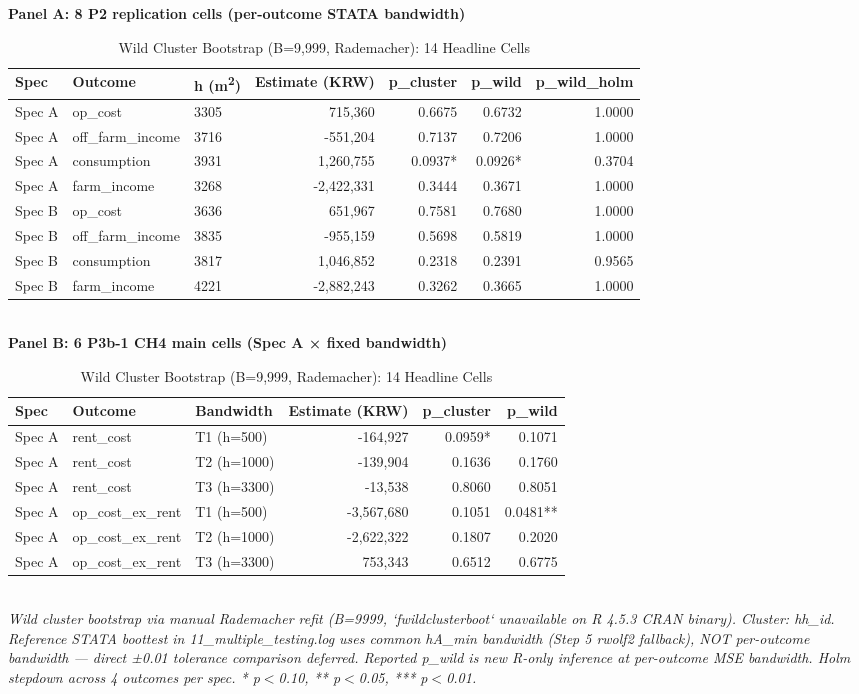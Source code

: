 \begin{table}[t]
\centering
\caption{Wild Cluster Bootstrap (B=9,999, Rademacher): 14 Headline Cells}
\label{tab:wild_bootstrap_en}
\textbf{Panel A: 8 P2 replication cells (per-outcome STATA bandwidth)}\\
\begin{tabular}{lllrrrr}
\toprule
Spec & Outcome & h (m\textsuperscript{2}) & Estimate (KRW) & p\_cluster & p\_wild & p\_wild\_holm \\
\midrule
Spec A & op\_cost & 3305 & 715,360 & 0.6675 & 0.6732 & 1.0000 \\
Spec A & off\_farm\_income & 3716 & -551,204 & 0.7137 & 0.7206 & 1.0000 \\
Spec A & consumption & 3931 & 1,260,755 & 0.0937* & 0.0926* & 0.3704 \\
Spec A & farm\_income & 3268 & -2,422,331 & 0.3444 & 0.3671 & 1.0000 \\
Spec B & op\_cost & 3636 & 651,967 & 0.7581 & 0.7680 & 1.0000 \\
Spec B & off\_farm\_income & 3835 & -955,159 & 0.5698 & 0.5819 & 1.0000 \\
Spec B & consumption & 3817 & 1,046,852 & 0.2318 & 0.2391 & 0.9565 \\
Spec B & farm\_income & 4221 & -2,882,243 & 0.3262 & 0.3665 & 1.0000 \\
\bottomrule
\end{tabular}\\[1ex]
\textbf{Panel B: 6 P3b-1 CH4 main cells (Spec A × fixed bandwidth)}\\
\begin{tabular}{lllrrr}
\toprule
Spec & Outcome & Bandwidth & Estimate (KRW) & p\_cluster & p\_wild \\
\midrule
Spec A & rent\_cost & T1 (h=500) & -164,927 & 0.0959* & 0.1071 \\
Spec A & rent\_cost & T2 (h=1000) & -139,904 & 0.1636 & 0.1760 \\
Spec A & rent\_cost & T3 (h=3300) & -13,538 & 0.8060 & 0.8051 \\
Spec A & op\_cost\_ex\_rent & T1 (h=500) & -3,567,680 & 0.1051 & 0.0481** \\
Spec A & op\_cost\_ex\_rent & T2 (h=1000) & -2,622,322 & 0.1807 & 0.2020 \\
Spec A & op\_cost\_ex\_rent & T3 (h=3300) & 753,343 & 0.6512 & 0.6775 \\
\bottomrule
\end{tabular}\\
\footnotesize\textit{Wild cluster bootstrap via manual Rademacher refit (B=9999, `fwildclusterboot` unavailable on R 4.5.3 CRAN binary). Cluster: hh\_id. Reference STATA boottest in 11\_multiple\_testing.log uses common hA\_min bandwidth (Step 5 rwolf2 fallback), NOT per-outcome bandwidth — direct ±0.01 tolerance comparison deferred. Reported p\_wild is new R-only inference at per-outcome MSE bandwidth. Holm stepdown across 4 outcomes per spec. * p$<$0.10, ** p$<$0.05, *** p$<$0.01.}
\end{table}

